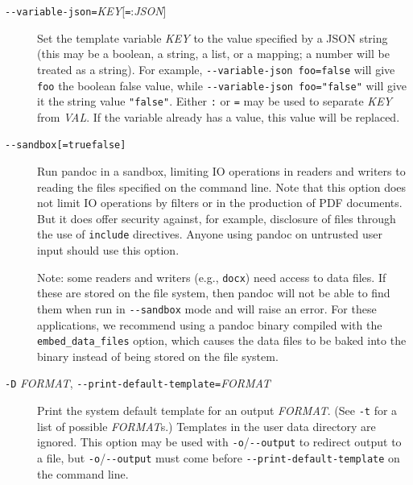 \documentclass[
]{article}
\begin{document}
\begin{description}
\item[\texttt{-\/-variable-json=}\emph{KEY}{[}\texttt{=}:\emph{JSON}{]}]
Set the template variable \emph{KEY} to the value specified by a JSON
string (this may be a boolean, a string, a list, or a mapping; a number
will be treated as a string). For example,
\texttt{-\/-variable-json\ foo=false} will give \texttt{foo} the boolean
false value, while
\texttt{-\/-variable-json\ foo=\textquotesingle{}"false"\textquotesingle{}}
will give it the string value \texttt{"false"}. Either \texttt{:} or
\texttt{=} may be used to separate \emph{KEY} from \emph{VAL}. If the
variable already has a value, this value will be replaced.
\item[\texttt{-\/-sandbox{[}=true\textbar{}false{]}}]
Run pandoc in a sandbox, limiting IO operations in readers and writers
to reading the files specified on the command line. Note that this
option does not limit IO operations by filters or in the production of
PDF documents. But it does offer security against, for example,
disclosure of files through the use of \texttt{include} directives.
Anyone using pandoc on untrusted user input should use this option.

Note: some readers and writers (e.g., \texttt{docx}) need access to data
files. If these are stored on the file system, then pandoc will not be
able to find them when run in \texttt{-\/-sandbox} mode and will raise
an error. For these applications, we recommend using a pandoc binary
compiled with the \texttt{embed\_data\_files} option, which causes the
data files to be baked into the binary instead of being stored on the
file system.
\item[\texttt{-D} \emph{FORMAT},
\texttt{-\/-print-default-template=}\emph{FORMAT}]
Print the system default template for an output \emph{FORMAT}. (See
\texttt{-t} for a list of possible \emph{FORMAT}s.) Templates in the
user data directory are ignored. This option may be used with
\texttt{-o}/\texttt{-\/-output} to redirect output to a file, but
\texttt{-o}/\texttt{-\/-output} must come before
\texttt{-\/-print-default-template} on the command line.


\end{description}
\end{document}

